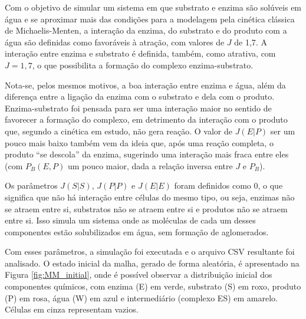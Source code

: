 \documentclass[12pt,oneside]{report}
\begin{document}
Com o objetivo de simular um sistema em que substrato e enzima são solúveis em água e se aproximar mais das condições para a modelagem pela cinética clássica de Michaelis-Menten, a interação da enzima, do substrato e do produto com a água são definidas como favoráveis à atração, com valores de $J$ de 1{,}7. A interação entre enzima e substrato é definida, também, como atrativa, com $J = 1{,}7$, o que possibilita a formação do complexo enzima-substrato.

Nota-se, pelos mesmos motivos, a boa interação entre enzima e água, além da diferença entre a ligação da enzima com o substrato e dela com o produto. Enzima-substrato foi pensada para ser uma interação maior no sentido de favorecer a formação do complexo, em detrimento da interação com o produto que, segundo a cinética em estudo, não gera reação. O valor de $J (E|P)$ ser um pouco mais baixo também vem da ideia que, após uma reação completa, o produto ``se descola'' da enzima, sugerindo uma interação mais fraca entre eles (com $P_B (E,P)$ um pouco maior, dada a relação inversa entre $J$ e $P_B$).

Os parâmetros $J (S|S)$, $J (P|P)$ e $J (E|E)$ foram definidos como 0, o que significa que não há interação entre células do mesmo tipo, ou seja, enzimas não se atraem entre si, substratos não se atraem entre si e produtos não se atraem entre si. Isso simula um sistema onde as moléculas de cada um desses componentes estão solubilizados em água, sem formação de aglomerados.

Com esses parâmetros, a simulação foi executada e o arquivo CSV resultante foi analisado. O estado inicial da malha, gerado de forma aleatória, é apresentado na Figura \ref{fig:MM_initial}, onde é possível observar a distribuição inicial dos componentes químicos, com enzima (E) em verde, substrato (S) em roxo, produto (P) em rosa, água (W) em azul e intermediário (complexo ES) em amarelo. Células em cinza representam vazios.
\end{document}
